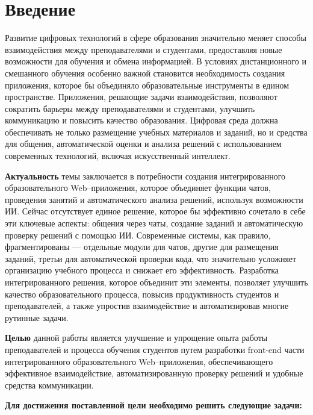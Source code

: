 \newpage
{}
\section*{Введение}

Развитие цифровых технологий в сфере образования значительно меняет способы взаимодействия между преподавателями и студентами, предоставляя новые возможности для обучения и обмена информацией. В условиях дистанционного и смешанного обучения особенно важной становится необходимость создания приложения, которое бы объединяло образовательные инструменты в едином пространстве. Приложения, решающие задачи взаимодействия, позволяют сократить барьеры между преподавателями и студентами, улучшить коммуникацию и повысить качество образования. Цифровая среда должна обеспечивать не только размещение учебных материалов и заданий, но и средства для общения, автоматической оценки и анализа решений с использованием современных технологий, включая искусственный интеллект.

\textbf{Актуальность} темы заключается в потребности создания интегрированного образовательного Web–приложения, которое объединяет функции чатов, проведения занятий и автоматического анализа решений, используя возможности ИИ. Сейчас отсутствует единое решение, которое бы эффективно сочетало в себе эти ключевые аспекты: общения через чаты, создание заданий и автоматическую проверку решений с помощью ИИ. Современные системы, как правило, фрагментированы — отдельные модули для чатов, другие для размещения заданий, третьи для автоматической проверки кода, что значительно усложняет организацию учебного процесса и снижает его эффективность. Разработка интегрированного решения, которое объединит эти элементы, позволяет улучшить качество образовательного процесса, повысив продуктивность студентов и преподавателей, а также упростив взаимодействие и автоматизировав многие рутинные задачи.

\textbf{Целью} данной работы является улучшение и упрощение опыта работы преподавателей и процесса обучения студентов путем разработки front-end части интегрированного образовательного Web–приложения, обеспечивающего эффективное взаимодействие, автоматизированную проверку решений и удобные средства коммуникации.

\textbf{Для достижения поставленной цели необходимо решить следующие задачи:}

